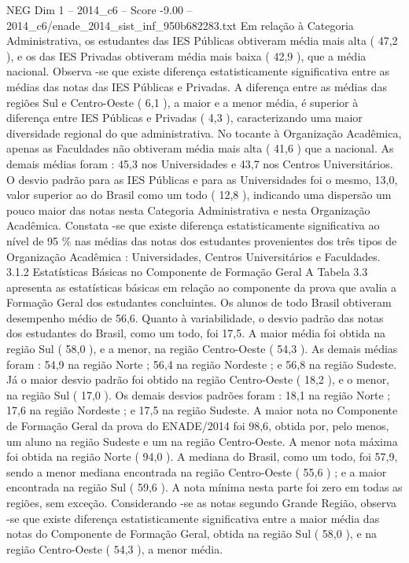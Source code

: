 \begin{textsample}{NEG Dim 1 – 2014\_c6 – Score -9.00 – 2014\_c6/enade\_2014\_sist\_inf\_950b682283.txt}
Em relação à Categoria Administrativa, os estudantes das IES Públicas obtiveram média mais alta ( 47,2 ), e os das IES Privadas obtiveram média mais baixa ( 42,9 ), que a média nacional.
Observa -se que existe diferença estatisticamente significativa entre as médias das notas das IES Públicas e Privadas.
A diferença entre as médias das regiões Sul e Centro-Oeste ( 6,1 ), a maior e a menor média, é superior à diferença entre IES Públicas e Privadas ( 4,3 ), caracterizando uma maior diversidade regional do que administrativa.
No tocante à Organização Acadêmica, apenas as Faculdades não obtiveram média mais alta ( 41,6 ) que a nacional.
As demais médias foram : 45,3 nos Universidades e 43,7 nos Centros Universitários.
O desvio padrão para as IES Públicas e para as Universidades foi o mesmo, 13,0, valor superior ao do Brasil como um todo ( 12,8 ), indicando uma dispersão um pouco maior das notas nesta Categoria Administrativa e nesta Organização Acadêmica.
Constata -se que existe diferença estatisticamente significativa ao nível de 95 \% nas médias das notas dos estudantes provenientes dos três tipos de Organização Acadêmica : Universidades, Centros Universitários e Faculdades. 3.1.2 Estatísticas Básicas no Componente de Formação Geral A Tabela 3.3 apresenta as estatísticas básicas em relação ao componente da prova que avalia a Formação Geral dos estudantes concluintes.
Os alunos de todo Brasil obtiveram desempenho médio de 56,6.
Quanto à variabilidade, o desvio padrão das notas dos estudantes do Brasil, como um todo, foi 17,5.
A maior média foi obtida na região Sul ( 58,0 ), e a menor, na região Centro-Oeste ( 54,3 ).
As demais médias foram : 54,9 na região Norte ; 56,4 na região Nordeste ; e 56,8 na região Sudeste.
Já o maior desvio padrão foi obtido na região Centro-Oeste ( 18,2 ), e o menor, na região Sul ( 17,0 ).
Os demais desvios padrões foram : 18,1 na região Norte ; 17,6 na região Nordeste ; e 17,5 na região Sudeste.
A maior nota no Componente de Formação Geral da prova do ENADE/2014 foi 98,6, obtida por, pelo menos, um aluno na região Sudeste e um na região Centro-Oeste.
A menor nota máxima foi obtida na região Norte ( 94,0 ).
A mediana do Brasil, como um todo, foi 57,9, sendo a menor mediana encontrada na região Centro-Oeste ( 55,6 ) ; e a maior encontrada na região Sul ( 59,6 ).
A nota mínima nesta parte foi zero em todas as regiões, sem exceção.
Considerando -se as notas segundo Grande Região, observa -se que existe diferença estatisticamente significativa entre a maior média das notas do Componente de Formação Geral, obtida na região Sul ( 58,0 ), e na região Centro-Oeste ( 54,3 ), a menor média.

\end{textsample}
